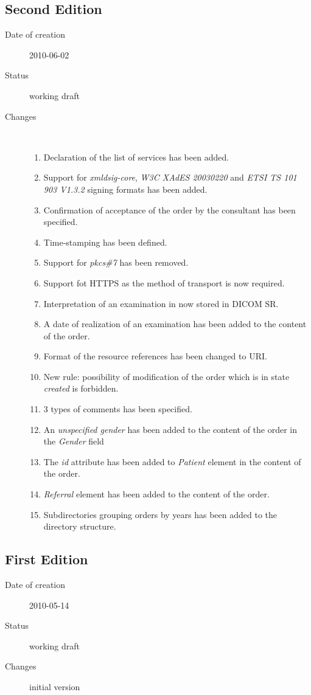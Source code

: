 \documentclass[a4paper]{article}
\begin{document}
\subsection{Second Edition}
\begin{description}
  \item[Date of creation] 2010-06-02
  \item[Status] working draft
  \item[Changes] \hfill \\
	\begin{enumerate}
      \item Declaration of the list of services has been added.
	  \item Support for \emph{xmldsig-core}, \emph{W3C XAdES 20030220} 
		and \emph{ETSI TS 101 903 V1.3.2} signing formats has been added.
	  \item Confirmation of acceptance of the order by the consultant has been specified.
	  \item Time-stamping has been defined.
      \item Support for \emph{pkcs\#7} has been removed.
      \item Support fot HTTPS as the method of transport is now required.
      \item Interpretation of an examination in now stored in DICOM SR.
      \item A date of realization of an examination has been added to the content of the order.
      \item Format of the resource references has been changed to URI.
      \item New rule: possibility of modification of the order which is in state \emph{created}
		is forbidden.
      \item 3 types of comments has been specified.
      \item An \emph{unspecified gender} has been added to the content of the 
			order in the \emph{Gender} field
      \item The \emph{id} attribute has been added to \emph{Patient} element in the content
			of the order. 
      \item \emph{Referral} element has been added to the content of the order.
      \item Subdirectories grouping orders by years has been added to the directory 
		structure.
	\end{enumerate}
\end{description}

\subsection{First Edition}
\begin{description}
  \item[Date of creation] 2010-05-14
  \item[Status] working draft
  \item[Changes] initial version
\end{description}
\end{document}
